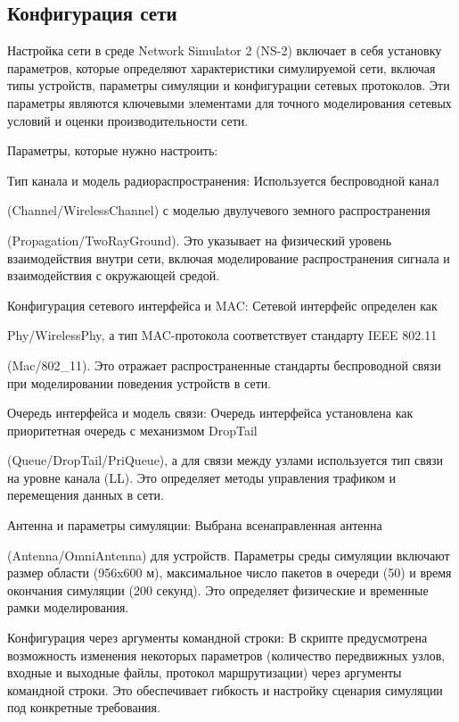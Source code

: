 \subsection*{Конфигурация сети}

Настройка сети в среде Network Simulator 2 (NS-2) включает в себя установку параметров, которые определяют характеристики симулируемой сети, включая типы устройств, параметры симуляции и конфигурации сетевых протоколов. Эти параметры являются ключевыми элементами для точного моделирования сетевых условий и оценки производительности сети.

Параметры, которые нужно настроить:

Тип канала и модель радиораспространения:
Используется беспроводной канал 

(Channel/WirelessChannel) с моделью двулучевого земного распространения

(Propagation/TwoRayGround). Это указывает на физический уровень взаимодействия внутри сети, включая моделирование распространения сигнала и взаимодействия с окружающей средой.

Конфигурация сетевого интерфейса и MAC:
Сетевой интерфейс определен как 

Phy/WirelessPhy, а тип MAC-протокола соответствует стандарту IEEE 802.11 

(Mac/802\_11). Это отражает распространенные стандарты беспроводной связи при моделировании поведения устройств в сети.

Очередь интерфейса и модель связи: 
Очередь интерфейса установлена как приоритетная очередь с механизмом DropTail 

(Queue/DropTail/PriQueue), а для связи между узлами используется тип связи на уровне канала (LL). 
Это определяет методы управления трафиком и перемещения данных в сети.

Антенна и параметры симуляции: 
Выбрана всенаправленная антенна 

(Antenna/OmniAntenna) для устройств. Параметры среды симуляции включают размер области (956x600 м), максимальное число пакетов в очереди (50) 
и время окончания симуляции (200 секунд). Это определяет физические и временные рамки моделирования.

Конфигурация через аргументы командной строки: В скрипте предусмотрена возможность изменения некоторых параметров (количество передвижных узлов, входные и выходные файлы, протокол маршрутизации) через аргументы командной строки. Это обеспечивает гибкость и настройку сценария симуляции под конкретные требования.

